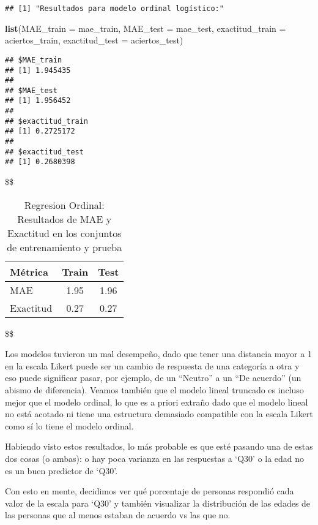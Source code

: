 \documentclass[
]{article}
\newenvironment{Shaded}{\begin{snugshade}}{\end{snugshade}}
\newcommand{\AttributeTok}[1]{\textcolor[rgb]{0.13,0.29,0.53}{#1}}
\newcommand{\FunctionTok}[1]{\textcolor[rgb]{0.13,0.29,0.53}{\textbf{#1}}}
\newcommand{\NormalTok}[1]{#1}
\begin{document}
\begin{verbatim}
## [1] "Resultados para modelo ordinal logístico:"
\end{verbatim}

\begin{Shaded}
\begin{Highlighting}[]
\FunctionTok{list}\NormalTok{(}\AttributeTok{MAE\_train =}\NormalTok{ mae\_train, }\AttributeTok{MAE\_test =}\NormalTok{ mae\_test, }\AttributeTok{exactitud\_train =}\NormalTok{ aciertos\_train, }\AttributeTok{exactitud\_test =}\NormalTok{ aciertos\_test)}
\end{Highlighting}
\end{Shaded}

\begin{verbatim}
## $MAE_train
## [1] 1.945435
## 
## $MAE_test
## [1] 1.956452
## 
## $exactitud_train
## [1] 0.2725172
## 
## $exactitud_test
## [1] 0.2680398
\end{verbatim}

\$\$

\begin{table}[H]
\centering
\begin{tabular}{|l|c|c|}
\hline
\textbf{Métrica} & \textbf{Train} & \textbf{Test} \\
\hline
MAE & 1.95 & 1.96 \\
\hline
Exactitud & 0.27 & 0.27 \\
\hline
\end{tabular}
\caption{Regresion Ordinal: Resultados de MAE y Exactitud en los conjuntos de entrenamiento y prueba}
\end{table}

\$\$

Los modelos tuvieron un mal desempeño, dado que tener una distancia
mayor a 1 en la escala Likert puede ser un cambio de respuesta de una
categoría a otra y eso puede significar pasar, por ejemplo, de un
``Neutro'' a un ``De acuerdo'' (un abismo de diferencia). Veamos también
que el modelo lineal truncado es incluso mejor que el modelo ordinal, lo
que es a priori extraño dado que el modelo lineal no está acotado ni
tiene una estructura demasiado compatible con la escala Likert como sí
lo tiene el modelo ordinal.

Habiendo visto estos resultados, lo más probable es que esté pasando una
de estas dos cosas (o ambas): o hay poca varianza en las respuestas a
`Q30' o la edad no es un buen predictor de `Q30'.

Con esto en mente, decidimos ver qué porcentaje de personas respondió
cada valor de la escala para `Q30' y también visualizar la distribución
de las edades de las personas que al menos estaban de acuerdo vs las que
no.
\end{document}
